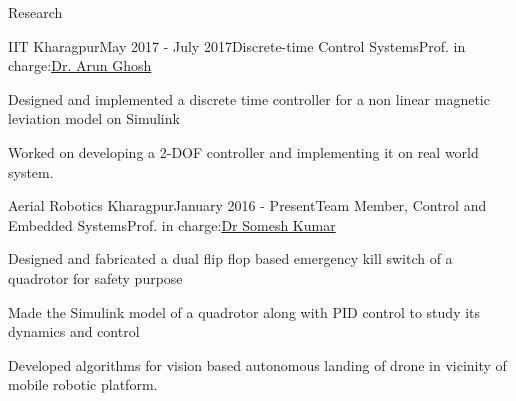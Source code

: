\documentclass{resume} %
\begin{document}
\begin{rSection}{Research}

\begin{rSubsection}{IIT Kharagpur}{May 2017 - July 2017}{Discrete-time Control Systems}{Prof. in charge:\href{http://www.iitkgp.ac.in/department/EE/faculty/ee-arun}{Dr. Arun Ghosh}}
\item Designed and implemented a discrete time controller for a non linear magnetic leviation model on Simulink
\item Worked on developing a 2-DOF controller and implementing it on real world system.
\end{rSubsection}



\begin{rSubsection}{Aerial Robotics Kharagpur}{January 2016 - Present}{Team Member, Control and Embedded Systems}{Prof. in charge:\href{http://www.facweb.iitkgp.ernet.in/~smsh/} {Dr Somesh Kumar}}
\item Designed and fabricated a dual flip flop based emergency kill switch of a quadrotor for safety purpose
\item Made the Simulink model of a quadrotor along with PID control to study its dynamics and control
\item Developed algorithms for vision based autonomous landing of drone
in vicinity of mobile robotic platform.
\end{rSubsection}

\end{rSection}





\end{document}
